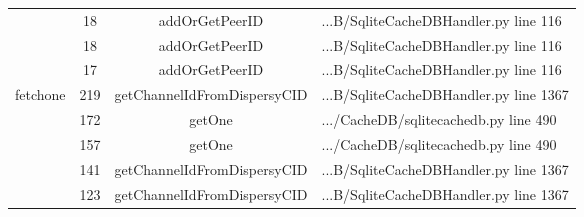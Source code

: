 \begin{table}[]
{\begin{tabular}{|c|c|c|l|}
		\multicolumn{1}{|c|}{} & \multicolumn{1}{c|}{18}  & \multicolumn{1}{c|}{addOrGetPeerID}  & \multicolumn{1}{l|}{...B/SqliteCacheDBHandler.py line 116}  \\ \cline{2-4} 
		\multicolumn{1}{|c|}{} & \multicolumn{1}{c|}{18}  & \multicolumn{1}{c|}{addOrGetPeerID}  & \multicolumn{1}{l|}{...B/SqliteCacheDBHandler.py line 116}  \\ \cline{2-4} 
		\multicolumn{1}{|c|}{} & \multicolumn{1}{c|}{17}  & \multicolumn{1}{c|}{addOrGetPeerID}  & \multicolumn{1}{l|}{...B/SqliteCacheDBHandler.py line 116}  \\ \hline 
		\multicolumn{1}{|c|}{\multirow{5}{*}{fetchone}} & \multicolumn{1}{c|}{219} & \multicolumn{1}{c|}{getChannelIdFromDispersyCID} & \multicolumn{1}{l|}{...B/SqliteCacheDBHandler.py line 1367} \\ \cline{2-4}
		\multicolumn{1}{|c|}{} & \multicolumn{1}{c|}{172}  & \multicolumn{1}{c|}{getOne}  & \multicolumn{1}{l|}{.../CacheDB/sqlitecachedb.py line 490}  \\ \cline{2-4} 
		\multicolumn{1}{|c|}{} & \multicolumn{1}{c|}{157}  & \multicolumn{1}{c|}{getOne}  & \multicolumn{1}{l|}{.../CacheDB/sqlitecachedb.py line 490}  \\ \cline{2-4} 
		\multicolumn{1}{|c|}{} & \multicolumn{1}{c|}{141}  & \multicolumn{1}{c|}{getChannelIdFromDispersyCID}  & \multicolumn{1}{l|}{...B/SqliteCacheDBHandler.py line 1367}  \\ \cline{2-4} 
		\multicolumn{1}{|c|}{} & \multicolumn{1}{c|}{123}  & \multicolumn{1}{c|}{getChannelIdFromDispersyCID}  & \multicolumn{1}{l|}{...B/SqliteCacheDBHandler.py line 1367}  \\ \hline 
		
	\end{tabular}}
\end{table}


